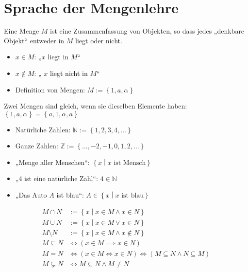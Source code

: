 \section{Sprache der Mengenlehre}
\begin{definition}
  Eine Menge $M$ ist eine Zusammenfassung von Objekten, so dass jedes „denkbare Objekt“ entweder in $M$ liegt oder nicht.
\end{definition}

\begin{itemize}
\item $x \in M$: „$x$ liegt in $M$“
\item $x \not\in M$: „ $x$ liegt nicht in $M$“
\item Definition von Mengen: $M := \left\{ 1, a, \alpha \right\}$
\end{itemize}

Zwei Mengen sind gleich, wenn sie dieselben Elemente haben: $\left\{ 1, a, \alpha \right\} = \left\{ a, 1, \alpha, a \right\}$

\begin{example}
  \begin{itemize}
  \item Natürliche Zahlen: $\mathbb{N} := \left\{ 1, 2, 3, 4, \dots \right\}$
  \item Ganze Zahlen: $\mathbb{Z} := \left\{ \dots, -2, -1, 0, 1, 2, \dots \right\}$
  \item „Menge aller Menschen“: $\left\{ x \middle| x \text{ ist Mensch} \right\}$
  \item „4 ist eine natürliche Zahl“: $4 \in \mathbb{N}$
  \item „Das Auto $A$ ist blau“: $A \in \left\{ x \middle| x \text{ ist blau} \right\}$
  \end{itemize}
\end{example}

\begin{definition}[Mengenoperationen]
  \begin{align*}
    M \cap N &:= \left\{ x \middle| x \in M \wedge x \in N \right\}\\
    M \cup N &:= \left\{ x \middle| x \in M \vee x \in N \right\}\\
    M \setminus N &:= \left\{ x \middle| x \in M \wedge x \not\in N \right\}\\
    M \subseteq N &\iff (x \in M \implies x \in N) \\
    M = N &\iff (x \in M \iff x \in N) \iff (M \subseteq N \wedge N \subseteq M) \\
    M \subsetneq N &\iff M \subseteq N \wedge M \neq N
  \end{align*}
\end{definition}

